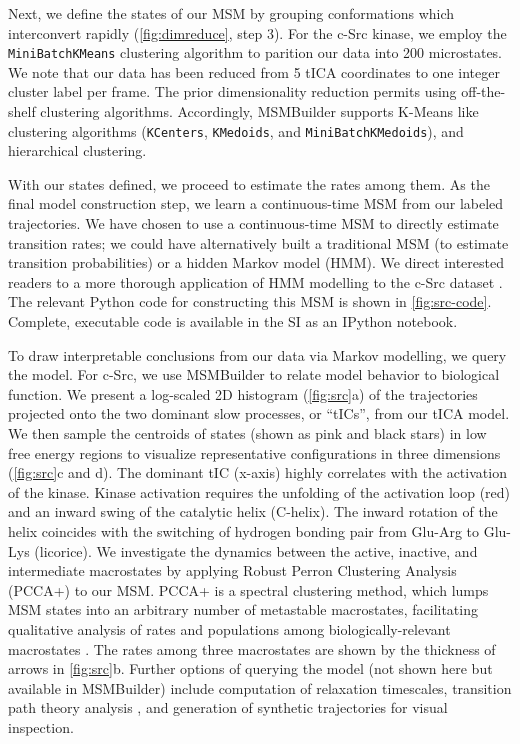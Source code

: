 Next, we define the states of our MSM by grouping conformations which
interconvert rapidly (\cref{fig:dimreduce}, step 3). For the c-Src kinase,
we employ the \texttt{MiniBatchKMeans} \cite{2010-minibatch-kmeans}
clustering algorithm to parition our data into 200 microstates. We note
that our data has been reduced from 5 tICA
coordinates to one integer cluster label per frame. 
The prior dimensionality reduction
permits using off-the-shelf clustering algorithms. Accordingly,
MSMBuilder supports K-Means like clustering algorithms (\texttt{KCenters},
\texttt{KMedoids}, and  \texttt{MiniBatchKMedoids}), and hierarchical clustering.

With our states defined, we proceed to estimate the rates among them. As
the final model construction step, we learn a continuous-time MSM
\cite{2015-ratematrix} from our labeled trajectories. We have chosen to use
a continuous-time MSM to directly estimate transition rates; we could have
alternatively built a traditional MSM (to estimate transition
probabilities) or a hidden Markov model (HMM). We direct interested readers
to a more thorough application of HMM modelling to the c-Src dataset
\cite{2014-hmm}. The relevant Python code for constructing this MSM is
shown in \cref{fig:src-code}. Complete, executable code is available in the
SI as an IPython \cite{2007-ipython} notebook.

To draw interpretable conclusions from our data via Markov modelling, we
query the model.  For c-Src, we use MSMBuilder to relate model behavior to
biological function.  We present a log-scaled 2D histogram
(\cref{fig:src}a) of the trajectories projected onto the two dominant slow
processes, or ``tICs'', from our tICA model. We then sample the centroids
of states (shown as pink and black stars) in low free energy regions to
visualize representative configurations in three dimensions \cite{1996-vmd}
(\cref{fig:src}c and d). The dominant tIC (x-axis) highly correlates with
the activation of the kinase. Kinase activation requires the unfolding of
the activation loop (red) and an inward swing of the catalytic helix
(C-helix). The inward rotation of the helix coincides with the switching of
hydrogen bonding pair from Glu-Arg  to Glu-Lys (licorice). We investigate
the dynamics between the active, inactive, and intermediate macrostates by
applying Robust Perron Clustering Analysis (PCCA+) to our MSM. PCCA+ is a
spectral clustering method, which lumps MSM states into an arbitrary number
of metastable macrostates, facilitating qualitative analysis of rates and
populations among biologically-relevant macrostates \cite{2005-pcca}. The
rates among three macrostates are shown by the thickness of arrows in
\cref{fig:src}b. Further options of querying the model (not shown here but
available in MSMBuilder) include computation of relaxation timescales,
transition path theory analysis \cite{Metzner_MMS09, Berezhkovskii_JCP09,
Noe_PNAS09}, and generation of synthetic trajectories for visual
inspection.

